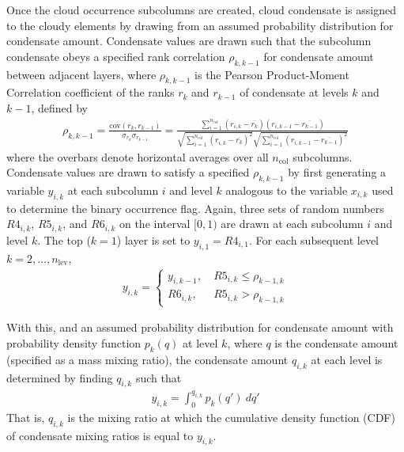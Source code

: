 Once the cloud occurrence subcolumns are created, cloud condensate is
assigned to the cloudy elements by drawing from an assumed probability
distribution for condensate amount. Condensate values are drawn such
that the subcolumn condensate obeys a specified rank correlation
\(\rho_{k, k-1}\) for condensate amount between adjacent layers, where
\(\rho_{k, k-1}\) is the Pearson Product-Moment Correlation coefficient
of the ranks \(r_{k}\) and \(r_{k-1}\) of condensate at levels \(k\) and
\(k-1\), defined by \begin{equation}\begin{gathered} 
    \rho_{k, k-1} = \frac{
        \textrm{cov}(r_{k}, r_{k-1})
    }{
        \sigma_{r_{k}} \sigma_{r_{k-1}} 
    } = \frac{
        \sum_{i=1}^{n_\textrm{col}} (r_{i, k} - \overline{r_{k}})(r_{i, k-1} - \overline{r_{k-1}}) 
    }{
        \sqrt{\sum_{i=1}^{n_\textrm{col}} (r_{i, k} - \overline{r_{k}})^2} \sqrt{\sum_{i=1}^{n_\textrm{col}} (r_{i, k-1} - \overline{r_{k-1}})^2} 
    } \end{gathered}\label{eq:rankcorr_equation}\end{equation} where the
overbars denote horizontal averages over all \(n_\textrm{col}\)
subcolumns. Condensate values are drawn to satisfy a specified
\(\rho_{k, k-1}\) by first generating a variable \(y_{i, k}\) at each
subcolumn \(i\) and level \(k\) analogous to the variable \(x_{i, k}\)
used to determine the binary occurrence flag. Again, three sets of
random numbers \(R4_{i, k}\), \(R5_{i, k}\), and \(R6_{i, k}\) on the
interval \([0, 1)\) are drawn at each subcolumn \(i\) and level \(k\).
The top (\(k = 1\)) layer is set to \(y_{i, 1} = R4_{i, 1}\). For each
subsequent level \(k = 2, \ldots, n_\textrm{lev}\), \[\begin{gathered} 
    y_{i, k} = \begin{cases} 
        y_{i, k-1}, ~ & R5_{i, k} \le \rho_{k-1, k} \\ 
        R6_{i, k},  ~ & R5_{i, k} > \rho_{k-1, k} 
    \end{cases}
\end{gathered}\]

With this, and an assumed probability distribution for condensate amount
with probability density function \(p_k(q)\) at level \(k\), where \(q\)
is the condensate amount (specified as a mass mixing ratio), the
condensate amount \(q_{i, k}\) at each level is determined by finding
\(q_{i, k}\) such that \[\begin{gathered} 
    y_{i, k} = \int_0^{q_{i, k}} p_{k}(q') ~dq'
\end{gathered}\] That is, \(q_{i, k}\) is the mixing ratio at which the
cumulative density function (CDF) of condensate mixing ratios is equal
to \(y_{i, k}\).


